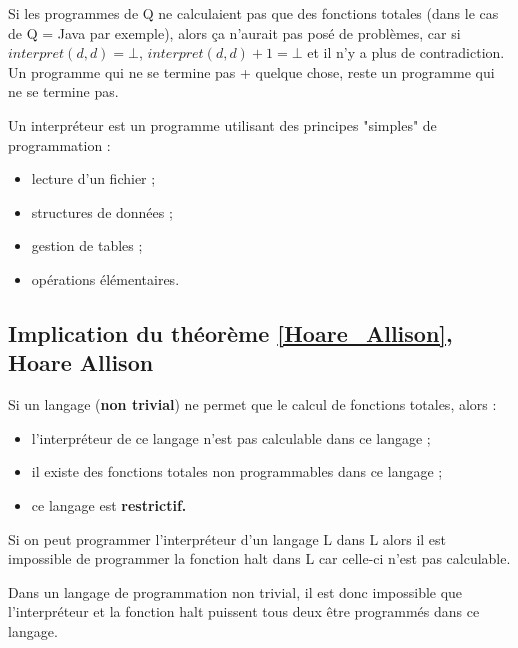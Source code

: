 \begin{myrem}
	Si les programmes de Q ne calculaient pas que des fonctions totales (dans le cas de Q = Java par exemple), alors ça n'aurait pas posé de problèmes, car si $interpret(d,d)=\bot$, $interpret(d,d)+1=\bot$ et il n'y a plus de contradiction.  Un programme qui ne se termine pas + quelque chose, reste un programme qui ne se termine pas.
\end{myrem}

\begin{myrem}
Un interpréteur est un programme  utilisant des principes "simples" de programmation :
\begin{itemize}
    \item lecture d'un fichier ;
    \item structures de données ;
    \item gestion de tables ;
    \item opérations élémentaires.
\end{itemize}
\end{myrem}

\subsection[Implication du théorème de Hoare Allison]{Implication du théorème \ref{Hoare_Allison}, Hoare Allison}
\begin{myprop}
	Si un langage (\textbf{non trivial}) ne permet que le calcul de fonctions totales, alors :
	\begin{itemize}
		\item l'interpréteur de ce langage n'est pas calculable dans ce langage ;
		\item il existe des fonctions totales non programmables dans ce langage ;
		\item ce langage est \bf{restrictif}.
	\end{itemize}
\end{myprop}

\begin{myprop}
	Si on peut programmer l'interpréteur d'un langage L dans L alors il est
	impossible de programmer la fonction halt dans L car celle-ci n'est pas calculable.
\end{myprop}

\begin{myprop}
	Dans un langage de programmation non trivial, il est donc impossible que
	l'interpréteur et la fonction halt puissent tous deux être programmés dans ce langage.
\end{myprop}

